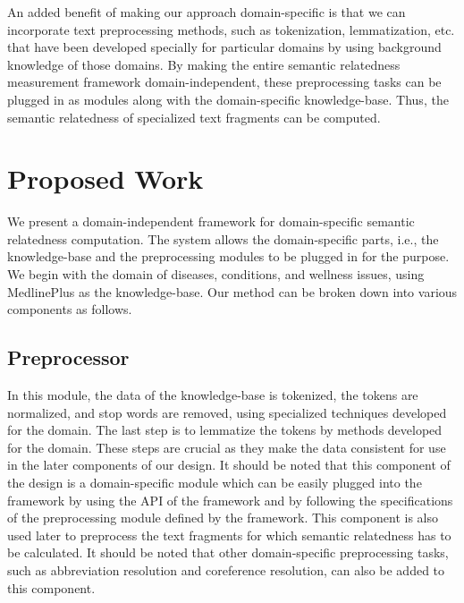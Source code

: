 \documentclass[conference]{IEEEtran}
\begin{document}
An added benefit of making our approach domain-specific is that we can incorporate text preprocessing methods, such as tokenization, lemmatization, etc. that have been developed specially for particular domains by using background knowledge of those domains. By making the entire semantic relatedness measurement framework domain-independent, these preprocessing tasks can be plugged in as modules along with the domain-specific knowledge-base. Thus, the semantic relatedness of specialized text fragments can be computed.


\section{Proposed Work}

We present a domain-independent framework for domain-specific semantic relatedness computation. The system allows the domain-specific parts, i.e., the knowledge-base and the preprocessing modules to be plugged in for the purpose. We begin with the domain of diseases, conditions, and wellness issues, using MedlinePlus as the knowledge-base.
Our method can be broken down into various components as follows.

\subsection{Preprocessor}

In this module, the data of the knowledge-base is tokenized, the tokens are normalized, and stop words are removed, using specialized techniques developed for the domain. The last step is to lemmatize the tokens by methods developed for the domain. These steps are crucial as they make the data consistent for use in the later components of our design. It should be noted that this component of the design is a domain-specific module which can be easily plugged into the framework by using the API of the framework and by following the specifications of the preprocessing module defined by the framework. This component is also used later to preprocess the text fragments for which semantic relatedness has to be calculated. It should be noted that other domain-specific preprocessing tasks, such as abbreviation resolution and coreference resolution, can also be added to this component.
\end{document}
